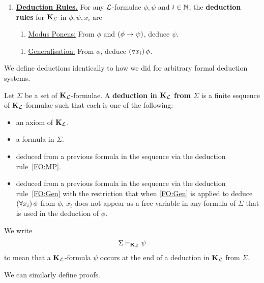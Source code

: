 \begin{boxdefinition}
\begin{enumerate}
        \item \textbf{\underline{Deduction Rules.}} For any $\mathcal{L}$-formulae $\phi, \psi$ and $i \in \mathbb{N}$, the \textbf{deduction rules} for $\KL$ in $\phi, \psi, x_i$ are
        \begin{enumerate}[label = \normalfont (MP)]
            \item\label{FO:MP}
            \underline{Modus Ponens:} From $\phi$ and $\left( \phi \to \psi \right)$, deduce $\psi$.
        \end{enumerate}
        \begin{enumerate}[label = \normalfont (Gen)]
            \item\label{FO:Gen}
            \underline{Generalisation:} From $\phi$, deduce $\left( \forall x_i \right)\phi$.
        \end{enumerate}
    \end{enumerate}
\end{boxdefinition}

We define deductions identically to how we did for arbitrary formal deduction systems.

\begin{boxdefinition}[Deductions in $\KL$]\label{Ch2:Def:Deductions_in_KL}
    Let $\Sigma$ be a set of $\KL$-formulae. A \textbf{deduction in $\KL$ from $\Sigma$} is a finite sequence of $\KL$-formulae such that each is one of the following:
    \begin{itemize}
        \item an axiom of $\KL$.
        \item a formula in $\Sigma$.
        \item deduced from a previous formula in the sequence via the deduction rule~\ref{FO:MP}.
        \item deduced from a previous formula in the sequence via the deduction rule~\ref{FO:Gen} with the restriction that when \ref{FO:Gen} is applied to deduce $\left( \forall x_i \right)\phi$ from $\phi$, $x_i$ does not appear as a free variable in any formula of $\Sigma$ that is used in the deduction of $\phi$.
    \end{itemize}
     We write
    \begin{align*}
        \Sigma \vdash_{\mathbf{K}_{\mathcal{L}}} \psi
    \end{align*}
    to mean that a $\KL$-formula $\psi$ occurs at the end of a deduction in $\KL$ from $\Sigma$.
\end{boxdefinition}

We can similarly define proofs.

